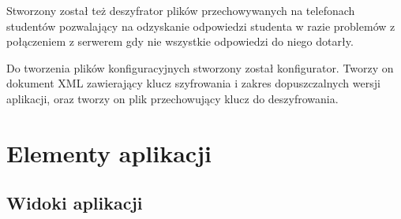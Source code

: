 \documentclass{report}
\begin{document}
	Stworzony został też deszyfrator plików przechowywanych na telefonach studentów pozwalający na odzyskanie odpowiedzi studenta w razie problemów z połączeniem z serwerem gdy nie wszystkie odpowiedzi do niego dotarły.
	
	Do tworzenia plików konfiguracyjnych stworzony został konfigurator. Tworzy on dokument XML zawierający klucz szyfrowania i zakres dopuszczalnych wersji aplikacji, oraz tworzy on plik przechowujący klucz do deszyfrowania.
	
	\chapter{Elementy aplikacji}
	
		\section{Widoki aplikacji}
		
\end{document}
